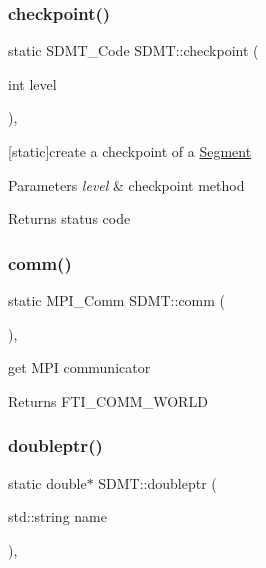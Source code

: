 \subsubsection{\texorpdfstring{checkpoint()}{checkpoint()}}
{\footnotesize\ttfamily static S\+D\+M\+T\+\_\+\+Code S\+D\+M\+T\+::checkpoint (\begin{DoxyParamCaption}\item[{int}]{level }\end{DoxyParamCaption})\hspace{0.3cm}{\ttfamily [inline]}, {\ttfamily [static]}}



\mbox{[}static\mbox{]}create a checkpoint of a \hyperlink{struct_s_d_m_t_1_1_segment}{Segment} 


\begin{DoxyParams}{Parameters}
{\em level} & checkpoint method \\
\hline
\end{DoxyParams}
\begin{DoxyReturn}{Returns}
status code 
\end{DoxyReturn}
\mbox{\label{class_s_d_m_t_a92bb161da5bd3ffd846ba811fc27c161}} 
\subsubsection{\texorpdfstring{comm()}{comm()}}
{\footnotesize\ttfamily static M\+P\+I\+\_\+\+Comm S\+D\+M\+T\+::comm (\begin{DoxyParamCaption}{ }\end{DoxyParamCaption})\hspace{0.3cm}{\ttfamily [inline]}, {\ttfamily [static]}}



get M\+PI communicator 

\begin{DoxyReturn}{Returns}
F\+T\+I\+\_\+\+C\+O\+M\+M\+\_\+\+W\+O\+R\+LD 
\end{DoxyReturn}
\mbox{\label{class_s_d_m_t_ab51288f0cabdd3a1ff1db6920c1096f7}} 
\subsubsection{\texorpdfstring{doubleptr()}{doubleptr()}}
{\footnotesize\ttfamily static double$\ast$ S\+D\+M\+T\+::doubleptr (\begin{DoxyParamCaption}\item[{std\+::string}]{name }\end{DoxyParamCaption})\hspace{0.3cm}{\ttfamily [inline]}, {\ttfamily [static]}}



